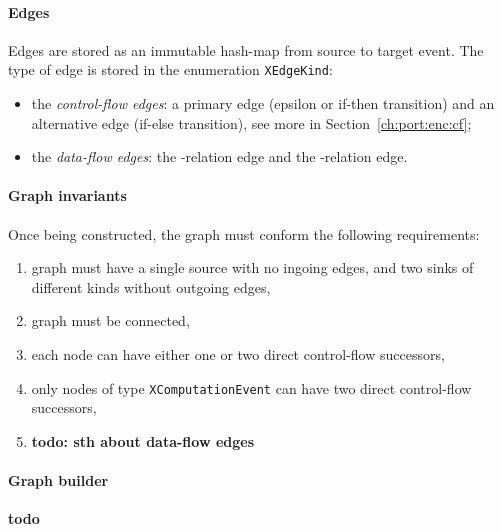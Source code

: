 \paragraph{Edges}
\label{ch:impl:model:xgraph:edges}
Edges are stored as an immutable hash-map from source to target event.
The type of edge is stored in the enumeration \texttt{XEdgeKind}:%
\begin{itemize}[noitemsep]
  \item the \textit{control-flow edges}: a primary edge (epsilon or if-then transition) and an alternative edge (if-else transition), see more in Section~\ref{ch:port:enc:cf};
  \item the \textit{data-flow edges}: the \co-relation edge and the \rf-relation edge. %
\end{itemize}


\paragraph{Graph invariants}
\label{ch:impl:model:xgraph:invariants}
Once being constructed, the graph must conform the following requirements:

\begin{enumerate}
\item graph must have a single source with no ingoing edges, and two sinks of different kinds without outgoing edges,
\item graph must be connected,
\item each node can have either one or two direct control-flow successors,
\item only nodes of type \texttt{XComputationEvent} can have two direct control-flow successors,
\item \textbf{todo: sth about data-flow edges}
\end{enumerate}


\paragraph{Graph builder} %
\label{ch:impl:model:xgraph:builder}

\textbf{todo}


